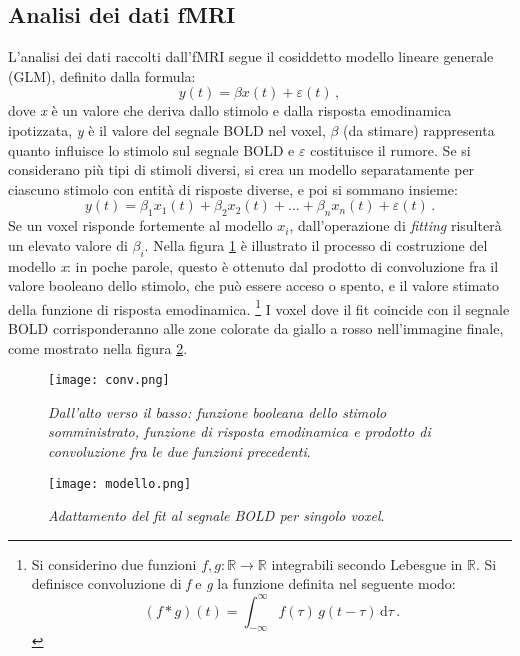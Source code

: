 \documentclass{report}
\newcommand{\figref}[1]{figura \ref{#1}}
\numberwithin{equation}{section}
\numberwithin{figure}{section}
\begin{document}
\subsection{Analisi dei dati fMRI}
L'analisi dei dati raccolti dall'fMRI segue il cosiddetto modello lineare generale (GLM), definito dalla formula:
\begin{equation}
    y(t) = \beta x(t) + \varepsilon(t)\,,
\end{equation}
dove \textit{x} è un valore che deriva dallo stimolo e dalla risposta emodinamica ipotizzata, \textit{y} è il valore del segnale BOLD nel voxel, $\beta$ (da stimare) rappresenta quanto influisce lo stimolo sul segnale BOLD e $\varepsilon$ costituisce il rumore. Se si considerano più tipi di stimoli diversi, si crea un modello separatamente per ciascuno stimolo con entità di risposte diverse, e poi si sommano insieme:
\begin{equation}
    y(t) = \beta_1 x_1(t) + \beta_2 x_2(t) + \ldots + \beta_n x_n(t) + \varepsilon(t)\,.
\end{equation}
Se un voxel risponde fortemente al modello $x_i$, dall'operazione di \textit{fitting} risulterà un elevato valore di $\beta_i$. Nella \figref{fig:conv} è illustrato il processo di costruzione del modello \textit{x}: in poche parole, questo è ottenuto dal prodotto di convoluzione fra il valore booleano dello stimolo, che può essere acceso o spento, e il valore stimato della funzione di risposta emodinamica.%
\footnote{Si considerino due funzioni $f,g:\mathbb{R} \to \mathbb{R}$ integrabili secondo Lebesgue in $\mathbb{R}$. Si definisce convoluzione di \textit{f} e \textit{g} la funzione definita nel seguente modo:
\begin{equation*}
\left( f \ast g \right) (t) = \int_{-\infty}^\infty f(\tau)\,g(t-\tau)\,\mathrm{d}\tau\,.
\end{equation*}}
I voxel dove il fit coincide con il segnale BOLD corrisponderanno alle zone colorate da giallo a rosso nell'immagine finale, come mostrato nella \figref{fig:modello}.

\begin{figure}[htp]
\centering
\texttt{[image: conv.png]}
\caption{\label{fig:conv} \textit{Dall'alto verso il basso: funzione booleana dello stimolo somministrato, funzione di risposta emodinamica e prodotto di convoluzione fra le due funzioni precedenti}.}
\end{figure}

\begin{figure}[H]
\centering
\texttt{[image: modello.png]}
\caption{\label{fig:modello} \textit{Adattamento del fit al segnale BOLD per singolo voxel}.}
\end{figure}
\end{document}
